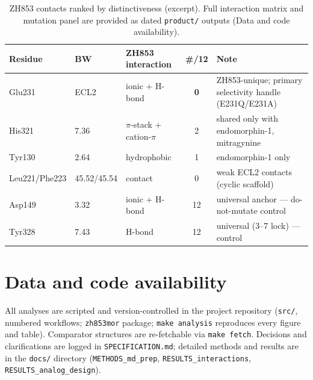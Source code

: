 \documentclass[11pt]{article}
\newcommand{\pistack}{$\pi$}
\begin{document}
\begin{table}[htbp]
  \centering
  \caption{ZH853 contacts ranked by distinctiveness (excerpt). Full interaction matrix and mutation
  panel are provided as dated \texttt{product/} outputs (Data and code availability).}
  \label{tab:distinctive}
  \footnotesize
  \setlength{\tabcolsep}{4pt}
  \begin{tabular}{@{}llp{2.9cm}cp{4.3cm}@{}}
    \toprule
    Residue & BW & ZH853 interaction & \#/12 & Note \\
    \midrule
    Glu231 & ECL2 & ionic + H-bond & \textbf{0} & ZH853-unique; primary selectivity handle
      (E231Q/E231A) \\
    His321 & 7.36 & \pistack-stack + cation-\pistack & 2 & shared only with endomorphin-1, mitragynine \\
    Tyr130 & 2.64 & hydrophobic & 1 & endomorphin-1 only \\
    Leu221/Phe223 & 45.52/45.54 & contact & 0 & weak ECL2 contacts (cyclic scaffold) \\
    Asp149 & 3.32 & ionic + H-bond & 12 & universal anchor --- do-not-mutate control \\
    Tyr328 & 7.43 & H-bond & 12 & universal (3--7 lock) --- control \\
    \bottomrule
  \end{tabular}
\end{table}

\section*{Data and code availability}

\sloppy
All analyses are scripted and version-controlled in the project repository (\texttt{src/}, numbered
workflows; \texttt{zh853mor} package; \texttt{make analysis} reproduces every figure and table).
Comparator structures are re-fetchable via \texttt{make fetch}. Decisions and clarifications are logged
in \texttt{SPECIFICATION.md}; detailed methods and results are in the \texttt{docs/} directory
(\texttt{METHODS\_md\_prep}, \texttt{RESULTS\_interactions}, \texttt{RESULTS\_analog\_design}).
\fussy
\end{document}
